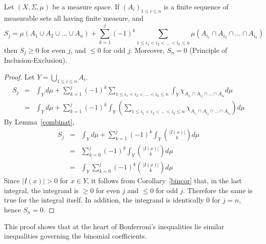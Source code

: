 \documentclass[12pt]{article}
\begin{document}
\begin{thm}
Let $(X, \Sigma, \mu)$ be a measure space.  If $(A_i)_{1 \leq i \leq n}$ is a finite sequence of measurable sets all having finite measure, and 
\begin{equation*}
S_j = \mu(A_1 \cup A_2 \cup \ldots \cup A_n) + \sum_{k=1}^j (-1)^k \sum_{1 \leq i_1<i_2<\ldots<i_k \leq n} \mu(A_{i_1}\cap A_{i_2} \cap \ldots \cap A_{i_k})
\end{equation*}
 then $S_j \geq 0$ for even $j$, and $\leq 0$ for odd $j$.  Moreover, $S_n = 0$ (Principle of Inclusion-Exclusion).
\end{thm}

\begin{proof}
Let $Y = \bigcup_{1 \leq i \leq n} A_i$.
\begin{eqnarray*}
S_j & = & \int_Y d\mu + \sum_{k=1}^j (-1)^k \sum_{1 \leq i_1<i_2<\ldots <i_k\leq n} \int_Y \chi_{A_{i_1} \cap A_{i_2} \cap \ldots \cap A_{i_k}} d\mu \\
    & = & \int_Y d\mu +  \sum_{k=1}^j (-1)^k \int_Y (\sum_{1 \leq i_1<i_2<\ldots <i_k\leq n} \chi_{A_{i_1} \cap A_{i_2} \cap \ldots \cap A_{i_k}}) d\mu
\end{eqnarray*}
By Lemma~\ref{combinat},
\begin{eqnarray*}
S_j & = & \int_Y d\mu + \sum_{k=1}^j (-1)^k \int_Y \binom{|I(x)|}{k} d\mu \\
    & = &  \sum_{k=0}^j (-1)^k \int_Y \binom{|I(x)|}{k} d\mu \\
    & = & \int_Y \sum_{k=0}^j (-1)^k \binom{|I(x)|}{k} d\mu
\end{eqnarray*}
Since $|I(x)| >0$ for $x \in Y$, it follows from Corollary~\ref{bincor} that, in the last integral, the integrand is $\geq 0$ for even $j$ and $\leq 0$ for odd $j$. Therefore the same is true for the integral itself. In addition, the integrand is identically 0 for $j=n$, hence $S_n = 0$.
\end{proof}

This proof shows that at the heart of Bonferroni's inequalities lie similar inequalities governing the binomial coefficients.

\end{document}
